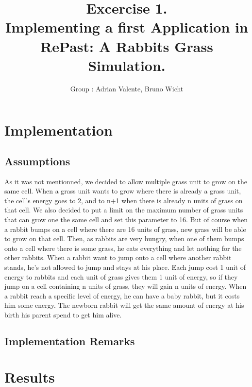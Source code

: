 \documentclass[11pt]{article}
\title{\bf Excercise 1.\\ Implementing a first Application in RePast: A Rabbits Grass Simulation.}
\author{Group \textnumero: Adrian Valente, Bruno Wicht}
\begin{document}
\maketitle

\section{Implementation}

\subsection{Assumptions}
As it was not mentionned, we decided to allow multiple grass unit to grow on the same cell. When a grass unit wants to grow where there is already a grass unit, the cell's energy goes to 2, and to n+1 when there is already n units of grass on that cell. We also decided to put a limit on the maximum number of grass units that can grow one the same cell and set this parameter to 16. But of course when a rabbit bumps on a cell where there are 16 units of grass, new grass will be able to grow on that cell. 
\newline
Then, as rabbits are very hungry, when one of them bumps onto a cell where there is some grass, he eats everything and let nothing for the other rabbits.
\newline
When a rabbit want to jump onto a cell where another rabbit stands, he's not allowed to jump and stays at his place.
\newline 
Each jump cost 1 unit of energy to rabbits and each unit of grass gives them 1 unit of energy, so if they jump on a cell containing n units of grass, they will gain n units of energy.
\newline
When a rabbit reach a specific level of energy, he can have a baby rabbit, but it costs him some energy. The newborn rabbit will get the same amount of energy at his birth his parent spend to get him alive. 

\subsection{Implementation Remarks}

\section{Results}
\end{document}
